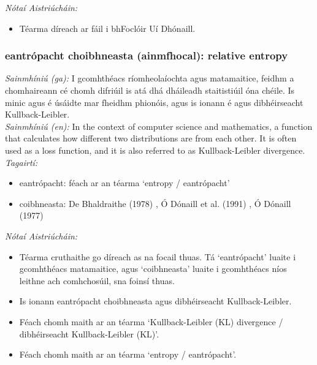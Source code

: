  \noindent \textit{Nótaí Aistriúcháin:}
\begin{itemize}
	\item Téarma díreach ar fáil i bhFoclóir Uí Dhónaill.
\end{itemize}


\subsubsection*{eantrópacht choibhneasta (ainmfhocal): relative entropy}
 \noindent \textit{Sainmhíniú (ga):} I gcomhthéacs ríomheolaíochta agus matamaitice, feidhm a chomhaireann cé chomh difriúil is atá dhá dháileadh staitistiúil óna chéile. Is minic agus é úsáidte mar fheidhm phionóis, agus is ionann é agus dibhéirseacht Kullback-Leibler.
\\
 \noindent \textit{Sainmhíniú (en):} In the context of computer science and mathematics, a function that calculates how different two distributions are from each other. It is often used as a loss function, and it is also referred to as Kullback-Leibler divergence.
\\
 \noindent \textit{Tagairtí:}
\begin{itemize}
	\item eantrópacht: féach ar an téarma `entropy / eantrópacht'
	\item coibhneasta: De Bhaldraithe (1978) \cite{de-bhaldraithe}, Ó Dónaill et al. (1991) \cite{focloir-beag}, Ó Dónaill (1977) \cite{odonaill}
\end{itemize}

 \noindent \textit{Nótaí Aistriúcháin:}
\begin{itemize}
	\item Téarma cruthaithe go díreach as na focail thuas. Tá `eantrópacht' luaite i gcomhthéacs matamaitice, agus `coibhneasta' luaite i gcomhthéacs níos leithne ach comhchosúil, sna foinsí thuas.
	\item Is ionann eantrópacht choibhneasta agus dibhéirseacht Kullback-Leibler.
	\item Féach chomh maith ar an téarma `Kullback-Leibler (KL) divergence / dibhéirseacht Kullback-Leibler (KL)'.
	\item Féach chomh maith ar an téarma `entropy / eantrópacht'.
\end{itemize}


